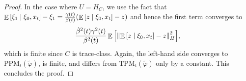 \begin{proof}
  In the case where \(U = H_{C}\), we use the fact that \(\mathop{\mathbb{E}}\qty[\xi_{1} \mid \xi_{0}, x_{t}] - \xi_{1} = \frac{\gamma(t)}{\beta(t)}\qty(\mathop{\mathbb{E}}\qty[z \mid \xi_{0}, x_{t}] - z)\) and hence the first term converges to
  \[
    \frac{\dot{\beta}^{2}(t) \gamma^{2}(t)}{\beta^{2}(t)} \mathop{\mathbb{E}}\qty[\norm{\mathop{\mathbb{E}}\qty[z \mid \xi_{0}, x_{t}] - z}^{2}_{H}],
  \]
  which is finite since \(C\) is trace-class. Again, the left-hand side converges to \(\mathrm{PPM}_{t}(\widetilde{\varphi})\), is finite, and differs from \(\mathrm{TPM}_{t}(\widetilde{\varphi})\) only by a constant. This concludes the proof.
\end{proof}

